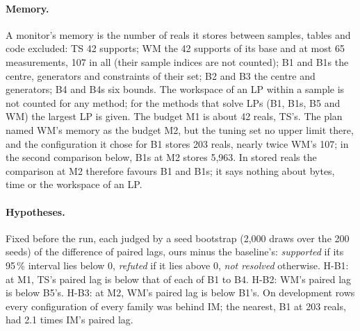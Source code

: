 \paragraph{Memory.} A monitor's memory is the number of reals it stores between samples, tables and code excluded:
TS 42 supports; WM the 42 supports of its base and at most 65 measurements, 107 in all (their sample indices are not
counted); B1 and B1s the centre, generators and constraints of their set; B2 and B3 the centre and generators; B4 and
B4s six bounds. The workspace of an LP within a sample is not counted for any method; for the methods that solve LPs
(B1, B1s, B5 and WM) the largest LP is given. The budget M1 is about 42 reals, TS's. The plan named WM's memory as the budget M2, but the
tuning set no upper limit there, and the configuration it chose for B1 stores 203 reals, nearly twice WM's 107; in the
second comparison below, B1s at M2 stores 5,963. In stored reals the comparison at M2 therefore favours B1 and B1s; it
says nothing about bytes, time or the workspace of an LP.

\paragraph{Hypotheses.} Fixed before the run, each judged by a seed bootstrap (2,000 draws over the 200 seeds) of the
difference of paired lags, ours minus the baseline's: \emph{supported} if its 95\,\% interval lies below 0,
\emph{refuted} if it lies above 0, \emph{not resolved} otherwise. H-B1: at M1, TS's paired lag is below that of each
of B1 to B4. H-B2: WM's paired lag is below B5's. H-B3: at M2, WM's paired lag is below B1's. On development rows
every configuration of every family was behind IM; the nearest, B1 at 203 reals, had 2.1 times IM's paired lag.

